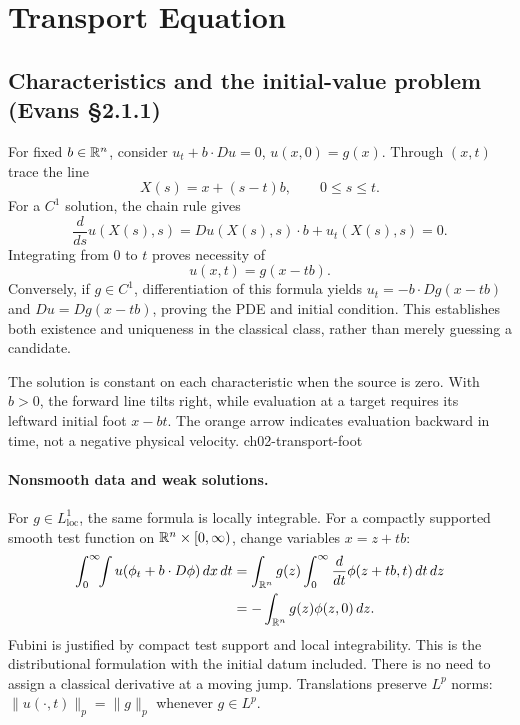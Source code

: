 \section{Transport Equation}
\label{sec:2-1}

\subsection{Characteristics and the initial-value problem (Evans \S2.1.1)}
For fixed $b\in\mathbb{R}^n$, consider $u_t+b\cdot Du=0$, $u(x,0)=g(x)$.
Through $(x,t)$ trace the line
\[
 X(s)=x+(s-t)b,\qquad 0\leq s\leq t.
\]
For a $C^1$ solution, the chain rule gives
\[
 \frac d{ds}u(X(s),s)=Du(X(s),s)\cdot b+u_t(X(s),s)=0.
\]
Integrating from $0$ to $t$ proves necessity of
\[
 \boxed{u(x,t)=g(x-tb).}
\]
Conversely, if $g\in C^1$, differentiation of this formula yields
$u_t=-b\cdot Dg(x-tb)$ and $Du=Dg(x-tb)$, proving the PDE and initial
condition. This establishes both existence and uniqueness in the classical
class, rather than merely guessing a candidate.
\Needspace{45mm}


{The solution is constant on each characteristic when the source is zero. With $b>0$, the forward line tilts right, while evaluation at a target requires its leftward initial foot $x-bt$. The orange arrow indicates evaluation backward in time, not a negative physical velocity.}
{ch02-transport-foot}

\paragraph{Nonsmooth data and weak solutions.}
For $g\in L^1_{\mathrm{loc}}$, the same formula is locally integrable.
For a compactly supported smooth test function on
$\mathbb{R}^n\times[0,\infty)$, change variables $x=z+tb$:
\[
 \begin{split}
 \int_0^\infty\!\!\int u(\phi_t+b\cdot D\phi)\,dx\,dt
 &=\int_{\mathbb{R}^n}g(z)\int_0^\infty
          \frac d{dt}\phi(z+tb,t)\,dt\,dz\\
 &=-\int_{\mathbb{R}^n}g(z)\phi(z,0)\,dz.
 \end{split}
\]
Fubini is justified by compact test support and local integrability.
This is the distributional formulation with the initial datum included.
There is no need to assign a classical derivative at a moving jump.
Translations preserve $L^p$ norms:
$\|u(\cdot,t)\|_p=\|g\|_p$ whenever $g\in L^p$.

